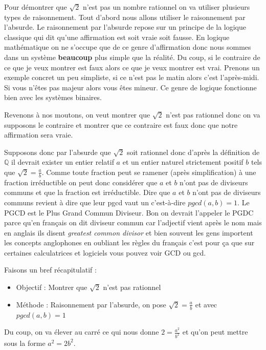 \documentclass[a4paper, 11pt, twoside]{book}
\newcommand{\Q}{\mathbb{Q}}
\begin{document}
Pour démontrer que \(\sqrt{2}\) n'est pas un nombre rationnel on va
utiliser plusieurs types de raisonnement. Tout d'abord nous allons
utiliser le raisonnement par l'absurde. Le raisonnement par
l'absurde repose sur un principe de la logique classique qui dit
qu'une affirmation est soit vraie soit fausse. En logique
mathématique on ne s'occupe que de ce genre d'affirmation donc nous
sommes dans un système \textbf{beaucoup} plus simple que la réalité. Du
coup, si le contraire de ce que je veux montrer est faux alors ce
que je veux montrer est vrai. Prenons un exemple concret un peu
simpliste, si ce n'est pas le matin alors c'est l'après-midi. Si
vous n'êtes pas majeur alors vous êtes mineur. Ce genre de logique
fonctionne bien avec les systèmes binaires.

Revenons à nos moutons, on veut montrer que \(\sqrt{2}\) n'est pas
rationnel donc on va supposons le contraire et montrer que ce
contraire est faux donc que notre affirmation sera vraie.

Supposons donc par l'absurde que \(\sqrt{2}\) soit rationnel donc
d'après la définition de \(\Q\) il devrait exister un entier
relatif \(a\) et un entier naturel strictement positif \(b\) tels que
\(\sqrt{2} = \frac{a}{b}\). Comme toute fraction peut se ramener
(après simplification) à une fraction irréductible on peut donc
considérer que \(a\) et \(b\) n'ont pas de diviseurs communs et que la
fraction est irréductible. Dire que \(a\) et \(b\) n'ont pas de
diviseurs communs revient à dire que leur pgcd vaut un c'est-à-dire
\(pgcd(a, b) = 1\). Le PGCD est le Plus Grand Commun Diviseur. Bon on
devrait l'appeler le PGDC parce qu'en français on dit diviseur
commun car l'adjectif vient après le nom mais en anglais ils disent
\emph{greatest common divisor} et bien souvent les gens importent les
concepts anglophones en oubliant les règles du français c'est pour
ça que sur certaines calculatrices et logiciels vous pouvez voir
GCD ou gcd.

Faisons un bref récapitulatif :
\begin{itemize}
\item Objectif : Montrer que \(\sqrt{2}\) n'est pas rationnel
\item Méthode : Raisonnement par l'absurde, on pose \(\sqrt{2} =
     \frac{a}{b}\) et avec \(pgcd(a, b) = 1\)
\end{itemize}

Du coup, on va élever au carré ce qui nous donne \(2 =
   \frac{a^2}{b^2}\) et qu'on peut mettre sous la forme \(a^2 = 2b^2\).
\end{document}
